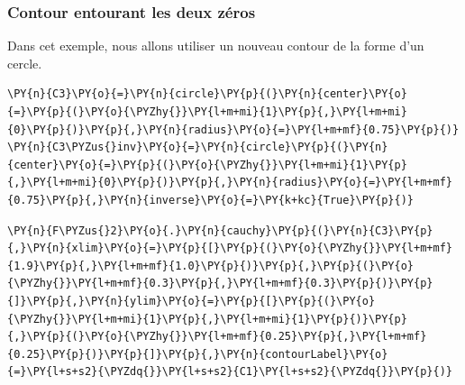 \subsubsection{Contour entourant les deux zéros}
Dans cet exemple, nous allons utiliser un nouveau contour de la forme d'un
cercle.
\begin{tcolorbox}[breakable, size=fbox, boxrule=1pt, pad at break*=1mm,colback=cellbackground, colframe=cellborder]
\begin{Verbatim}[commandchars=\\\{\}]
\PY{n}{C3}\PY{o}{=}\PY{n}{circle}\PY{p}{(}\PY{n}{center}\PY{o}{=}\PY{p}{(}\PY{o}{\PYZhy{}}\PY{l+m+mi}{1}\PY{p}{,}\PY{l+m+mi}{0}\PY{p}{)}\PY{p}{,}\PY{n}{radius}\PY{o}{=}\PY{l+m+mf}{0.75}\PY{p}{)}
\PY{n}{C3\PYZus{}inv}\PY{o}{=}\PY{n}{circle}\PY{p}{(}\PY{n}{center}\PY{o}{=}\PY{p}{(}\PY{o}{\PYZhy{}}\PY{l+m+mi}{1}\PY{p}{,}\PY{l+m+mi}{0}\PY{p}{)}\PY{p}{,}\PY{n}{radius}\PY{o}{=}\PY{l+m+mf}{0.75}\PY{p}{,}\PY{n}{inverse}\PY{o}{=}\PY{k+kc}{True}\PY{p}{)}
\end{Verbatim}
\end{tcolorbox}
\begin{tcolorbox}[breakable, size=fbox, boxrule=1pt, pad at break*=1mm,colback=cellbackground, colframe=cellborder]
\begin{Verbatim}[commandchars=\\\{\}]
\PY{n}{F\PYZus{}2}\PY{o}{.}\PY{n}{cauchy}\PY{p}{(}\PY{n}{C3}\PY{p}{,}\PY{n}{xlim}\PY{o}{=}\PY{p}{[}\PY{p}{(}\PY{o}{\PYZhy{}}\PY{l+m+mf}{1.9}\PY{p}{,}\PY{l+m+mf}{1.0}\PY{p}{)}\PY{p}{,}\PY{p}{(}\PY{o}{\PYZhy{}}\PY{l+m+mf}{0.3}\PY{p}{,}\PY{l+m+mf}{0.3}\PY{p}{)}\PY{p}{]}\PY{p}{,}\PY{n}{ylim}\PY{o}{=}\PY{p}{[}\PY{p}{(}\PY{o}{\PYZhy{}}\PY{l+m+mi}{1}\PY{p}{,}\PY{l+m+mi}{1}\PY{p}{)}\PY{p}{,}\PY{p}{(}\PY{o}{\PYZhy{}}\PY{l+m+mf}{0.25}\PY{p}{,}\PY{l+m+mf}{0.25}\PY{p}{)}\PY{p}{]}\PY{p}{,}\PY{n}{contourLabel}\PY{o}{=}\PY{l+s+s2}{\PYZdq{}}\PY{l+s+s2}{C1}\PY{l+s+s2}{\PYZdq{}}\PY{p}{)}
\end{Verbatim}
\end{tcolorbox}
